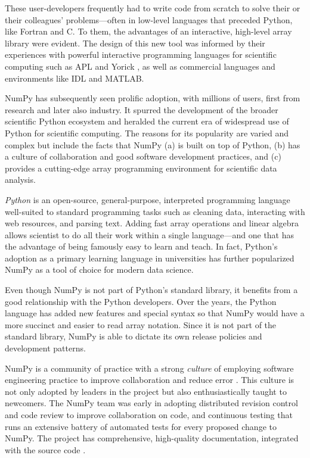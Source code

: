 These user-developers frequently had to write code from scratch to solve
their or their colleagues' problems---often in low-level languages
that preceded Python, like Fortran \cite{dongarra2008netlib} and C.
To them, the advantages of an interactive, high-level array library
were evident. The design of this new tool was informed by their
experiences with powerful interactive programming languages for
scientific computing such as APL \cite{iverson1962programming} and
Yorick \cite{munro1995using}, as well as commercial languages and
environments like IDL and {MATLAB}.

NumPy has subsequently seen prolific adoption, with millions of users,
first from research and later also industry.
It spurred the development of the broader scientific Python ecosystem and
heralded the current era of widespread use of Python for scientific computing.
The reasons for its popularity are varied and complex but include the facts that
NumPy (a) is built on top of Python,
(b) has a culture of collaboration and good software development practices, and
(c) provides a cutting-edge array programming environment for scientific data analysis.

\emph{Python} is an open-source, general-purpose, interpreted programming language
well-suited to standard programming tasks such as cleaning data,
interacting with web resources, and parsing text.
Adding fast array operations and linear algebra allows scientist to do all
their work within a single language---and one that has the advantage of
being famously easy to learn and teach.
In fact, Python's adoption as a primary learning language in universities
has further popularized NumPy as a tool of choice for modern data science.

Even though NumPy is not part of Python's standard library,
it benefits from a good relationship with the Python developers.
Over the years, the Python language has added new features and
special syntax so that NumPy would have a more succinct and 
easier to read array notation.
Since it is not part of the standard library, NumPy is able to
dictate its own release policies and development patterns.

NumPy is a community of practice with a strong \emph{culture} of
employing software engineering practice to improve collaboration and
reduce error \cite{millman2014developing}.  This culture is not only
adopted by leaders in the project but also enthusiastically taught to
newcomers. The NumPy team was early in adopting distributed revision
control and code review to improve collaboration on code, and
continuous testing that runs an extensive battery of automated tests for
every proposed change to NumPy.  The project has comprehensive,
high-quality documentation, integrated with the source
code \cite{vanderwalt2008scipy,harrington2008scipy,harrington2009scipy}.


